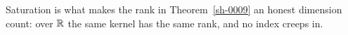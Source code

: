 \begin{remark}\label{sh-0008}
Saturation is what makes the rank in Theorem~\ref{sh-0009} an honest dimension count: over $\mathbb{R}$ the same kernel has the same rank, and no index creeps in.
\end{remark}